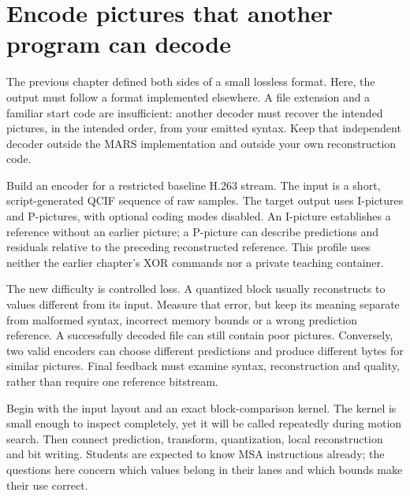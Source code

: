 \section{Encode pictures that another program can decode}
The previous chapter defined both sides of a small lossless format. Here, the
output must follow a format implemented elsewhere. A file extension and a familiar
start code are insufficient: another decoder must recover the intended pictures,
in the intended order, from your emitted syntax. Keep that independent decoder
outside the MARS implementation and outside your own reconstruction code.

Build an encoder for a restricted baseline H.263 stream. The input is a short,
script-generated QCIF sequence of raw samples. The target output uses I-pictures
and P-pictures, with optional coding modes disabled. An I-picture establishes a
reference without an earlier picture; a P-picture can describe predictions and
residuals relative to the preceding reconstructed reference. This profile uses
neither the earlier chapter's XOR commands nor a private teaching container.

The new difficulty is controlled loss. A quantized block usually reconstructs to
values different from its input. Measure that error, but keep its meaning separate
from malformed syntax, incorrect memory bounds or a wrong prediction reference.
A successfully decoded file can still contain poor pictures. Conversely, two
valid encoders can choose different predictions and produce different bytes for
similar pictures. Final feedback must examine syntax, reconstruction and quality,
rather than require one reference bitstream.

Begin with the input layout and an exact block-comparison kernel. The kernel is
small enough to inspect completely, yet it will be called repeatedly during motion
search. Then connect prediction, transform, quantization, local reconstruction and
bit writing. Students are expected to know MSA instructions already; the questions
here concern which values belong in their lanes and which bounds make their use
correct.
